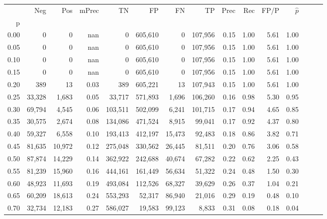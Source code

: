 \begin{tabular}{rrrrrrrrrrrrrrr}
\toprule
{} &     Neg &     Pos & mPrec &       TN &       FP &       FN &       TP &  Prec &   Rec &  FP/P & $\hat{p}$ \\
p    &         &         &       &          &          &          &          &       &       &       &           \\
\midrule
0.00 &       0 &       0 &   nan &        0 &  605,610 &        0 &  107,956 &  0.15 &  1.00 &  5.61 &      1.00 \\
0.05 &       0 &       0 &   nan &        0 &  605,610 &        0 &  107,956 &  0.15 &  1.00 &  5.61 &      1.00 \\
0.10 &       0 &       0 &   nan &        0 &  605,610 &        0 &  107,956 &  0.15 &  1.00 &  5.61 &      1.00 \\
0.15 &       0 &       0 &   nan &        0 &  605,610 &        0 &  107,956 &  0.15 &  1.00 &  5.61 &      1.00 \\
0.20 &     389 &      13 &  0.03 &      389 &  605,221 &       13 &  107,943 &  0.15 &  1.00 &  5.61 &      1.00 \\
0.25 &  33,328 &   1,683 &  0.05 &   33,717 &  571,893 &    1,696 &  106,260 &  0.16 &  0.98 &  5.30 &      0.95 \\
0.30 &  69,794 &   4,545 &  0.06 &  103,511 &  502,099 &    6,241 &  101,715 &  0.17 &  0.94 &  4.65 &      0.85 \\
0.35 &  30,575 &   2,674 &  0.08 &  134,086 &  471,524 &    8,915 &   99,041 &  0.17 &  0.92 &  4.37 &      0.80 \\
0.40 &  59,327 &   6,558 &  0.10 &  193,413 &  412,197 &   15,473 &   92,483 &  0.18 &  0.86 &  3.82 &      0.71 \\
0.45 &  81,635 &  10,972 &  0.12 &  275,048 &  330,562 &   26,445 &   81,511 &  0.20 &  0.76 &  3.06 &      0.58 \\
0.50 &  87,874 &  14,229 &  0.14 &  362,922 &  242,688 &   40,674 &   67,282 &  0.22 &  0.62 &  2.25 &      0.43 \\
0.55 &  81,239 &  15,960 &  0.16 &  444,161 &  161,449 &   56,634 &   51,322 &  0.24 &  0.48 &  1.50 &      0.30 \\
0.60 &  48,923 &  11,693 &  0.19 &  493,084 &  112,526 &   68,327 &   39,629 &  0.26 &  0.37 &  1.04 &      0.21 \\
0.65 &  60,209 &  18,613 &  0.24 &  553,293 &   52,317 &   86,940 &   21,016 &  0.29 &  0.19 &  0.48 &      0.10 \\
0.70 &  32,734 &  12,183 &  0.27 &  586,027 &   19,583 &   99,123 &    8,833 &  0.31 &  0.08 &  0.18 &      0.04 \\

\end{tabular}
